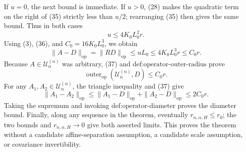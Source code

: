 If \(u=0\), the next bound is immediate. If \(u>0\), (28) makes the quadratic term on the right of (35) strictly less than \(u/2\); rearranging (35) then gives the same bound. Thus in both cases
\[
u\leq4K_0L_0^2r.
\tag{36}
\]
Using (3), (36), and \(C_0=16K_0L_0^3\), we obtain
\[
\|A-D\|_{\mathrm{op}}
=\|RD\|_{\mathrm{op}}
\leq uL_0
\leq4K_0L_0^3r
\leq C_0r.
\tag{37}
\]
Because \(A\in\mathcal U^{(n)}_\alpha\) was arbitrary, (37) and \(\text{def:operator-outer-radius}\) prove
\[
\operatorname{outer}_{\mathrm{op}}(\mathcal U^{(n)}_\alpha,D)
\leq C_0r.
\]
For any \(A_1,A_2\in\mathcal U^{(n)}_\alpha\), the triangle inequality and (37) give
\[
\|A_1-A_2\|_{\mathrm{op}}
\leq\|A_1-D\|_{\mathrm{op}}+\|A_2-D\|_{\mathrm{op}}
\leq2C_0r.
\]
Taking the supremum and invoking \(\text{def:operator-diameter}\) proves the diameter bound. Finally, along any sequence in the theorem, eventually \(r_{n,\alpha,H}\leq r_0\); the two bounds and \(r_{n,\alpha,H}\to0\) give both asserted limits. This proves the theorem without a candidate affine-separation assumption, a candidate scale assumption, or covariance invertibility.